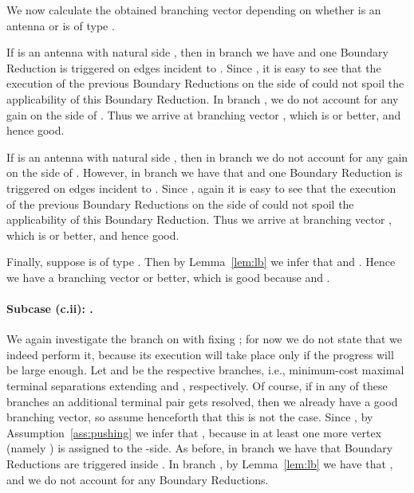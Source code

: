We now calculate the obtained branching vector depending on whether  is an antenna or is of type .

If  is an antenna with natural side , then in branch  we have  and one Boundary Reduction is triggered on edges incident to . Since , it is easy to see that the execution of the  previous Boundary Reductions on the side of  could not spoil the applicability of this Boundary Reduction. In branch , we do not account for any gain on the side of . Thus we arrive at branching vector , which is  or better, and hence good.

If  is an antenna with natural side , then in branch  we do not account for any gain on the side of . However, in branch  we have that  and one Boundary Reduction is triggered on edges incident to . Since , again it is easy to see that the execution of the  previous Boundary Reductions on the side of  could not spoil the applicability of this Boundary Reduction. Thus we arrive at branching vector , which is  or better, and hence good.

Finally, suppose  is of type . Then by Lemma~\ref{lem:lb} we infer that  and . Hence we have a branching vector  or better, which is good because  and .











\paragraph*{Subcase (c.ii): .}



We again investigate the branch on  with fixing ; for now we do not state that we indeed perform it, because its execution will take place only if the progress will be large enough. Let  and  be the respective branches, i.e., minimum-cost maximal terminal separations extending  and , respectively. Of course, if in any of these branches an additional terminal pair gets resolved, then we already have a good branching vector, so assume henceforth that this is not the case. Since , by Assumption~\ref{ass:pushing} we infer that , because in  at least one more vertex (namely ) is assigned to the -side. As before, in branch  we have that  Boundary Reductions are triggered inside . In branch , by Lemma~\ref{lem:lb} we have that , and we do not account for any Boundary Reductions.

